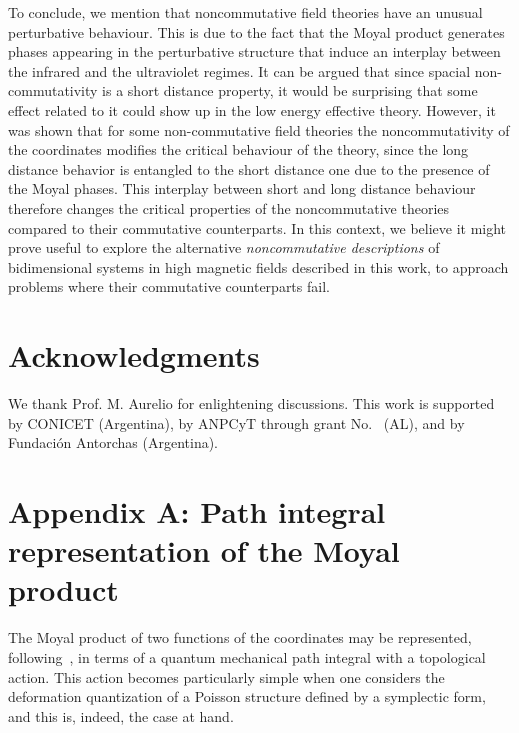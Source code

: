 \documentclass[a4paper,12pt]{article}
\begin{document}
To conclude, we mention that noncommutative field theories have an
unusual perturbative behaviour. This is due to the fact that the
Moyal
product generates phases appearing in the perturbative structure
that
induce an interplay between the infrared and the ultraviolet
regimes.
It can be argued that since spacial non-commutativity is a short
distance property, it would be surprising that some effect related
to
it could show up in the low energy effective theory. However, it
was
shown that for some non-commutative field theories
\cite{MST,cri1,cri2} the noncommutativity of the coordinates
modifies
the critical behaviour of the theory, since the long distance
behavior
is entangled to the short distance one due to the presence of the
Moyal phases. This interplay between short and long distance
behaviour
therefore changes the critical properties of the noncommutative
theories compared to their commutative counterparts. In this
context,
we believe it might prove useful to explore the alternative {\it
  noncommutative descriptions\/} of bidimensional systems in high
magnetic fields described in this work, to approach problems where
their commutative counterparts fail.





\section*{Acknowledgments}
We thank Prof. M. Aurelio for enlightening discussions.  This work
is
supported by CONICET (Argentina), by ANPCyT through grant No.\ 
\coordHE{} (AL), and by Fundaci{\'o}n Antorchas (Argentina).

\section*{Appendix A: Path integral representation of 
  the Moyal product} The Moyal product of two functions of the
coordinates \coordHE{} may be represented, following~\cite{cattaneo},
in
terms of a quantum mechanical path integral with a topological
action.
This action becomes particularly simple when one considers the
deformation quantization of a Poisson structure defined by a
symplectic form, and this is, indeed, the case at hand.
\end{document}

